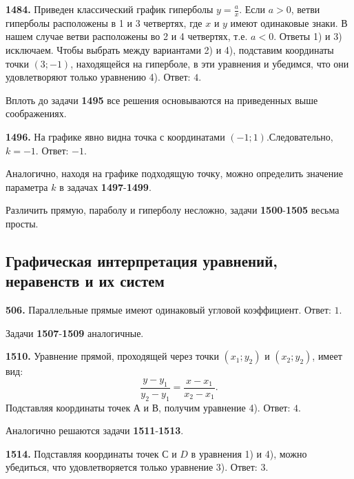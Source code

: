 \textbf{1484.} Приведен классический график гиперболы $y=\frac{a}{x}$. Если $a>0$, ветви гиперболы расположены в 1 и 3 четвертях, где $x$ и $y$ имеют одинаковые знаки. В нашем случае ветви расположены во 2 и 4 четвертях, т.е. $a<0$. Ответы 1) и 3) исключаем. Чтобы выбрать между вариантами 2) и 4), подставим координаты точки $(3;-1)$, находящейся на гиперболе,  в эти уравнения и убедимся, что они удовлетворяют только уравнению 4). \newline \null \hspace*{\fill} Ответ: $4$.

Вплоть до задачи \textbf{1495} все решения основываются на приведенных выше соображениях.

\textbf{1496.} На графике явно видна точка с координатами $(-1;1)$.\newline Следовательно, $k=-1$. \newline \null \hspace*{\fill} Ответ: $-1$. 

Аналогично, находя на графике подходящую точку, можно определить значение параметра $k$ в задачах \textbf{1497}-\textbf{1499}.

Различить прямую, параболу и гиперболу несложно, задачи \newline\textbf{1500}-\textbf{1505} весьма просты.

\subsection{Графическая интерпретация уравнений, неравенств и их систем}


\textbf{506.}  Параллельные прямые имеют одинаковый угловой коэффициент. \newline \null \hspace*{\fill} Ответ: $1$. 

Задачи  \textbf{1507}-\textbf{1509} аналогичные.

\newpage \textbf{1510.} Уравнение прямой, проходящей через точки $(x_1;y_2)$ и \newline $(x_2;y_2)$, имеет вид: $$\frac{y-y_1}{y_2-y_1}=\frac{x-x_1}{x_2-x_1}.$$
Подставляя координаты точек  А и В, получим уравнение 4). \newline \null \hspace*{\fill} Ответ: $4$. 

Аналогично решаются задачи \textbf{1511}-\textbf{1513}.

\textbf{1514.} Подставляя координаты точек $С$ и $D$ в уравнения 1) и 4), можно убедиться, что  удовлетворяется только уравнение 3). \newline \null \hspace*{\fill} Ответ: $3$.

